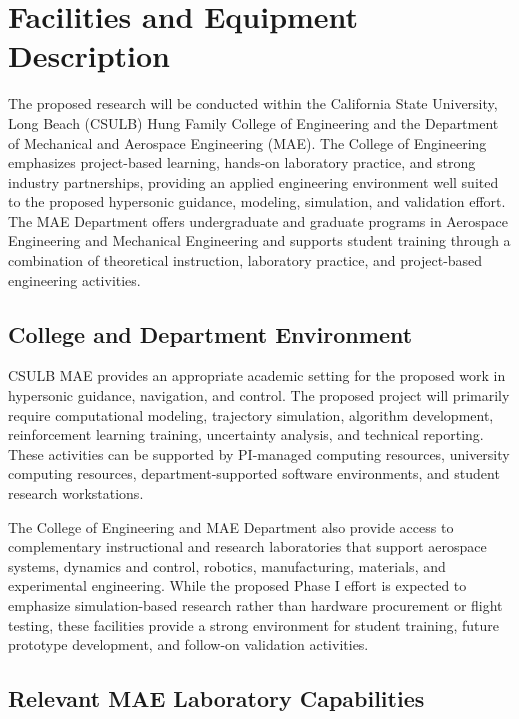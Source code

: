 \section{Facilities and Equipment Description}

The proposed research will be conducted within the California State University, Long Beach (CSULB) Hung Family College of Engineering and the Department of Mechanical and Aerospace Engineering (MAE). The College of Engineering emphasizes project-based learning, hands-on laboratory practice, and strong industry partnerships, providing an applied engineering environment well suited to the proposed hypersonic guidance, modeling, simulation, and validation effort. The MAE Department offers undergraduate and graduate programs in Aerospace Engineering and Mechanical Engineering and supports student training through a combination of theoretical instruction, laboratory practice, and project-based engineering activities.

\subsection{College and Department Environment}

CSULB MAE provides an appropriate academic setting for the proposed work in hypersonic guidance, navigation, and control. The proposed project will primarily require computational modeling, trajectory simulation, algorithm development, reinforcement learning training, uncertainty analysis, and technical reporting. These activities can be supported by PI-managed computing resources, university computing resources, department-supported software environments, and student research workstations.

The College of Engineering and MAE Department also provide access to complementary instructional and research laboratories that support aerospace systems, dynamics and control, robotics, manufacturing, materials, and experimental engineering. While the proposed Phase I effort is expected to emphasize simulation-based research rather than hardware procurement or flight testing, these facilities provide a strong environment for student training, future prototype development, and follow-on validation activities.

\subsection{Relevant MAE Laboratory Capabilities}

